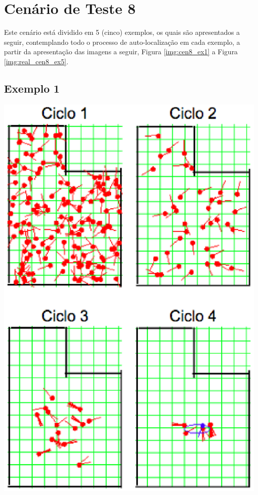 \section{Cenário de Teste 8}
\label{sec:cenario8}

Este cenário está dividido em 5 (cinco) exemplos, os quais são apresentados a seguir, contemplando todo o processo de auto-localização
em cada exemplo, a partir da apresentação das imagens a seguir, Figura \ref{img:cen8_ex1} a Figura \ref{img:real_cen8_ex5}.

\subsection{Exemplo 1}

{\centering
\includegraphics[scale=0.4]{figuras/cen8_ex1.eps}
\label{img:cen8_ex1}
\par}

